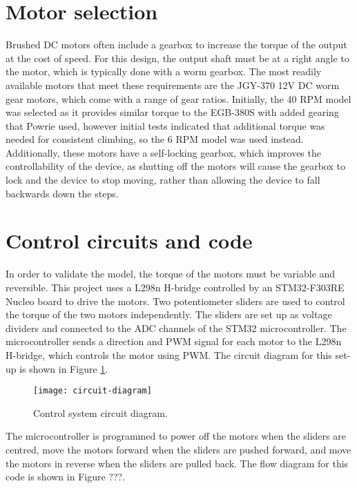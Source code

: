 \section{Motor selection}
Brushed DC motors often include a gearbox to increase the torque of the output at the cost of speed. For this design, the output shaft must be at a right angle to the motor, which is typically done with a worm gearbox. The most readily available motors that meet these requirements are the JGY-370 12V DC worm gear motors, which come with a range of gear ratios. Initially, the 40 RPM model was selected as it provides similar torque to the EGB-380S with added gearing that Powrie used, however initial tests indicated that additional torque was needed for consistent climbing, so the 6 RPM model was used instead.\\
Additionally, these motors have a self-locking gearbox, which improves the controllability of the device, as shutting off the motors will cause the gearbox to lock and the device to stop moving, rather than allowing the device to fall backwards down the steps.

\section{Control circuits and code}
In order to validate the model, the torque of the motors must be variable and reversible. This project uses a L298n H-bridge controlled by an STM32-F303RE Nucleo board to drive the motors. Two potentiometer sliders are used to control the torque of the two motors independently. The sliders are set up as voltage dividers and connected to the ADC channels of the STM32 microcontroller. The microcontroller sends a direction and PWM signal for each motor to the L298n H-bridge, which controls the motor using PWM. The circuit diagram for this set-up is shown in Figure \ref{fig:circuit-diagram}.\\

\begin{figure}[!h]
	\centering
	\texttt{[image: circuit-diagram]}
	\caption{Control system circuit diagram.}
	\label{fig:circuit-diagram}
\end{figure}

The microcontroller is programmed to power off the motors when the sliders are centred, move the motors forward when the sliders are pushed forward, and move the motors in reverse when the sliders are pulled back. The flow diagram for this code is shown in Figure ???.\\

